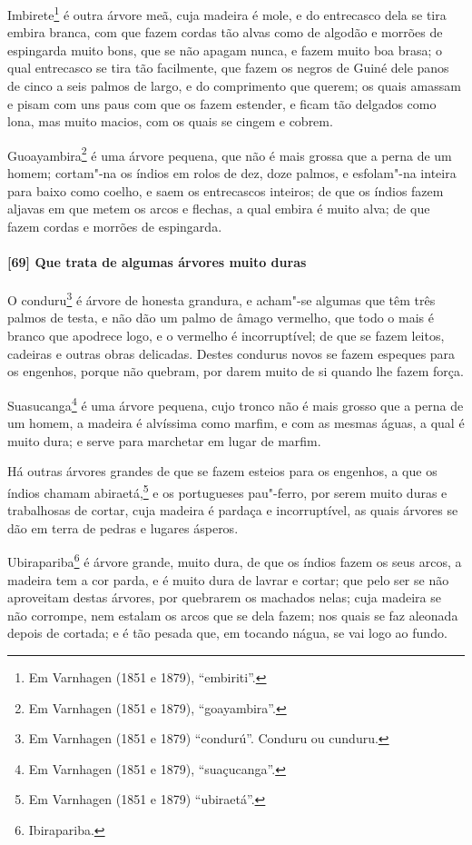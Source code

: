Imbirete\footnote{ Em Varnhagen (1851 e 1879), ``embiriti''.} é outra árvore meã, cuja
madeira é mole, e do entrecasco dela se tira embira branca, com que fazem cordas tão alvas
como de algodão e morrões de espingarda muito bons, que se não apagam nunca, e fazem muito
boa brasa; o qual entrecasco se tira tão facilmente, que fazem os negros de Guiné dele
panos de cinco a seis palmos de largo, e do comprimento que querem; os quais amassam e
pisam com uns paus com que os fazem estender, e ficam tão delgados como lona, mas muito
macios, com os quais se cingem e cobrem.

Guoayambira\footnote{ Em Varnhagen (1851 e 1879), ``goayambira''.} é uma árvore pequena,
que não é mais grossa que a perna de um homem; cortam"-na os índios em rolos de dez, doze
palmos, e esfolam"-na inteira para baixo como coelho, e saem os entrecascos inteiros; de
que os índios fazem aljavas em que metem os arcos e flechas, a qual embira é muito alva;
de que fazem cordas e morrões de espingarda.

\paragraph{[69] Que trata de algumas árvores muito duras}\quad
O conduru\footnote{ Em Varnhagen (1851 e 1879) ``condurú''. Conduru ou cunduru.} é árvore
de honesta grandura, e acham"-se algumas que têm três palmos de testa, e não dão um palmo
de âmago vermelho, que todo o mais é branco que apodrece logo, e o vermelho é
incorruptível; de que se fazem leitos, cadeiras e outras obras delicadas. Destes condurus
novos se fazem espeques para os engenhos, porque não quebram, por darem muito de si quando
lhe fazem força.

Suasucanga\footnote{ Em Varnhagen (1851 e 1879), ``suaçucanga''.} é uma árvore pequena,
cujo tronco não é mais grosso que a perna de um homem, a madeira é alvíssima como marfim,
e com as mesmas águas, a qual é muito dura; e serve para marchetar em lugar de marfim.

Há outras árvores grandes de que se fazem esteios para os engenhos, a que os índios chamam
abiraetá,\footnote{ Em Varnhagen (1851 e 1879) ``ubiraetá''.} e os portugueses pau"-ferro,
por serem muito duras e trabalhosas de cortar, cuja madeira é pardaça e incorruptível, as
quais árvores se dão em terra de pedras e lugares ásperos.

Ubirapariba\footnote{ Ibirapariba.} é árvore grande, muito dura, de que os índios fazem os
seus arcos, a madeira tem a cor parda, e é muito dura de lavrar e cortar; que pelo ser se
não aproveitam destas árvores, por quebrarem os machados nelas; cuja madeira se não
corrompe, nem estalam os arcos que se dela fazem; nos quais se faz aleonada depois de
cortada; e é tão pesada que, em tocando nágua, se vai logo ao fundo.


